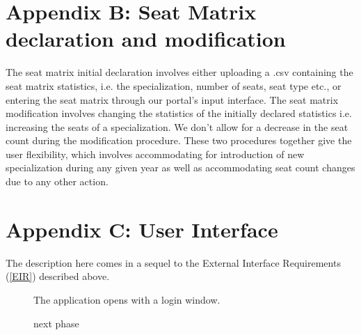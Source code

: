\documentclass{report}
\begin{document}
\section{Appendix B: Seat Matrix declaration and modification
}\label{Appendix B}
The seat matrix initial declaration involves either uploading a .csv containing the seat matrix statistics, i.e. the specialization, number of seats, seat type etc., or entering the seat matrix through our portal's input interface.
The seat matrix modification involves changing the statistics of the initially declared statistics i.e. increasing the seats of a specialization. We don't allow for a decrease in the seat count during the modification procedure.
These two procedures together give the user flexibility, which involves accommodating for introduction of new specialization during any given year as well as accommodating seat count changes due to any other action.
\section{Appendix C: User Interface}\label{Appendix C}
The description here comes in a sequel to the External Interface Requirements (\ref{EIR}) described above.
\\

\begin{figure}
\caption{The application opens with a login window.}
\end{figure}

\begin{figure}
\caption{next phase}
\end{figure}
\end{document}
